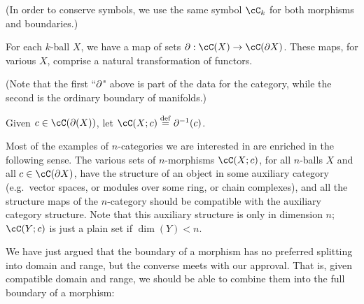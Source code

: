 (In order to conserve symbols, we use the same symbol $\cC_k$ for both morphisms and boundaries.)

\begin{axiom}\label{nca-boundary}
For each $k$-ball $X$, we have a map of sets $\bd: \cC(X)\to \cC(\bd X)$.
These maps, for various $X$, comprise a natural transformation of functors.
\end{axiom}

(Note that the first ``$\partial$" above is part of the data for the category, 
while the second is the ordinary boundary of manifolds.)

Given $c\in\cC(\bd(X))$, let $\cC(X; c) \deq \bd^{-1}(c)$.

Most of the examples of $n$-categories we are interested in are enriched in the following sense.
The various sets of $n$-morphisms $\cC(X; c)$, for all $n$-balls $X$ and
all $c\in \cC(\bd X)$, have the structure of an object in some auxiliary category
(e.g.\ vector spaces, or modules over some ring, or chain complexes),
and all the structure maps of the $n$-category should be compatible with the auxiliary
category structure.
Note that this auxiliary structure is only in dimension $n$;
$\cC(Y; c)$ is just a plain set if $\dim(Y) < n$.

\medskip
{}
\medskip

We have just argued that the boundary of a morphism has no preferred splitting into
domain and range, but the converse meets with our approval.
That is, given compatible domain and range, we should be able to combine them into
the full boundary of a morphism:

